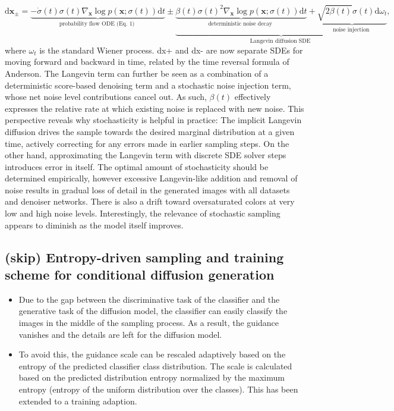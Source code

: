 \documentclass{article}
\begin{document}
\begin{itemize}
    $$
    \mathrm{d} \boldsymbol{x}_{ \pm}=\underbrace{-\dot{\sigma}(t) \sigma(t) \nabla_{\boldsymbol{x}} \log p(\boldsymbol{x} ; \sigma(t)) \mathrm{d} t}_{\text {probability flow ODE (Eq. 1) }} \pm \underbrace{\underbrace{\beta(t) \sigma(t)^2 \nabla_{\boldsymbol{x}} \log p(\boldsymbol{x} ; \sigma(t)) \mathrm{d} t}_{\text {deterministic noise decay }}+\underbrace{\sqrt{2 \beta(t)} \sigma(t) \mathrm{d} \omega_t}_{\text {noise injection }}}_{\text {Langevin diffusion SDE }},
    $$
    where $\omega_t$ is the standard Wiener process. dx+ and dx- are now separate SDEs for moving forward and backward in time, related by the time reversal formula of Anderson. The Langevin term can further be seen as a combination of a deterministic score-based denoising term and a stochastic noise injection term, whose net noise level contributions cancel out. As such, $\beta(t)$ effectively expresses the relative rate at which existing noise is replaced with new noise. This perspective reveals why stochasticity is helpful in practice: The implicit Langevin diffusion drives the sample towards the desired marginal distribution at a given time, actively correcting for any errors made in earlier sampling steps. On the other hand, approximating the Langevin term with discrete SDE solver steps introduces error in itself. The optimal amount of stochasticity should be determined empirically, however excessive Langevin-like addition and removal of noise results in gradual loss of detail in the generated images with all datasets and denoiser networks. There is also a drift toward oversaturated colors at very low and high noise levels. Interestingly, the relevance of stochastic sampling appears to diminish as the model itself improves.
\end{itemize}

\subsection{(skip) Entropy-driven sampling and training scheme
for conditional diffusion generation}
\begin{itemize}
    \item Due to the gap between the discriminative task of the classifier and the generative task of the diffusion model, the classifier can easily classify the images in the middle of the sampling process. As a result, the guidance vanishes and the details are left for the diffusion model.
    \item To avoid this, the guidance scale can be rescaled adaptively based on the entropy of the predicted classifier class distribution. The scale is calculated based on the predicted distribution entropy normalized by the maximum entropy (entropy of the uniform distribution over the classes). This has been extended to a training adaption.
\end{itemize}
\end{document}
